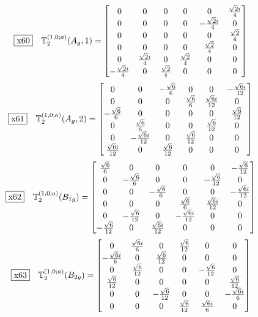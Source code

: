 \documentclass[fleqn,10pt,landscape]{jsarticle}
\begin{document}
\begin{dmath*}
\fbox{x60}\quad \mathbb{T}_{2}^{(1,0;a)}(A_{g},1)=\begin{bmatrix} 0 & 0 & 0 & 0 & 0 & \frac{\sqrt{2} i}{4} \\ 0 & 0 & 0 & 0 & - \frac{\sqrt{2} i}{4} & 0 \\ 0 & 0 & 0 & 0 & 0 & \frac{\sqrt{2}}{4} \\ 0 & 0 & 0 & 0 & \frac{\sqrt{2}}{4} & 0 \\ 0 & \frac{\sqrt{2} i}{4} & 0 & \frac{\sqrt{2}}{4} & 0 & 0 \\ - \frac{\sqrt{2} i}{4} & 0 & \frac{\sqrt{2}}{4} & 0 & 0 & 0 \end{bmatrix}
\end{dmath*}
\begin{dmath*}
\fbox{x61}\quad \mathbb{T}_{2}^{(1,0;a)}(A_{g},2)=\begin{bmatrix} 0 & 0 & - \frac{\sqrt{6}}{6} & 0 & 0 & - \frac{\sqrt{6} i}{12} \\ 0 & 0 & 0 & \frac{\sqrt{6}}{6} & \frac{\sqrt{6} i}{12} & 0 \\ - \frac{\sqrt{6}}{6} & 0 & 0 & 0 & 0 & \frac{\sqrt{6}}{12} \\ 0 & \frac{\sqrt{6}}{6} & 0 & 0 & \frac{\sqrt{6}}{12} & 0 \\ 0 & - \frac{\sqrt{6} i}{12} & 0 & \frac{\sqrt{6}}{12} & 0 & 0 \\ \frac{\sqrt{6} i}{12} & 0 & \frac{\sqrt{6}}{12} & 0 & 0 & 0 \end{bmatrix}
\end{dmath*}
\begin{dmath*}
\fbox{x62}\quad \mathbb{T}_{2}^{(1,0;a)}(B_{1g})=\begin{bmatrix} \frac{\sqrt{6}}{6} & 0 & 0 & 0 & 0 & - \frac{\sqrt{6}}{12} \\ 0 & - \frac{\sqrt{6}}{6} & 0 & 0 & - \frac{\sqrt{6}}{12} & 0 \\ 0 & 0 & - \frac{\sqrt{6}}{6} & 0 & 0 & - \frac{\sqrt{6} i}{12} \\ 0 & 0 & 0 & \frac{\sqrt{6}}{6} & \frac{\sqrt{6} i}{12} & 0 \\ 0 & - \frac{\sqrt{6}}{12} & 0 & - \frac{\sqrt{6} i}{12} & 0 & 0 \\ - \frac{\sqrt{6}}{12} & 0 & \frac{\sqrt{6} i}{12} & 0 & 0 & 0 \end{bmatrix}
\end{dmath*}
\begin{dmath*}
\fbox{x63}\quad \mathbb{T}_{2}^{(1,0;a)}(B_{2g})=\begin{bmatrix} 0 & \frac{\sqrt{6} i}{6} & 0 & \frac{\sqrt{6}}{12} & 0 & 0 \\ - \frac{\sqrt{6} i}{6} & 0 & \frac{\sqrt{6}}{12} & 0 & 0 & 0 \\ 0 & \frac{\sqrt{6}}{12} & 0 & 0 & - \frac{\sqrt{6}}{12} & 0 \\ \frac{\sqrt{6}}{12} & 0 & 0 & 0 & 0 & \frac{\sqrt{6}}{12} \\ 0 & 0 & - \frac{\sqrt{6}}{12} & 0 & 0 & - \frac{\sqrt{6} i}{6} \\ 0 & 0 & 0 & \frac{\sqrt{6}}{12} & \frac{\sqrt{6} i}{6} & 0 \end{bmatrix}
\end{dmath*}
\end{document}
